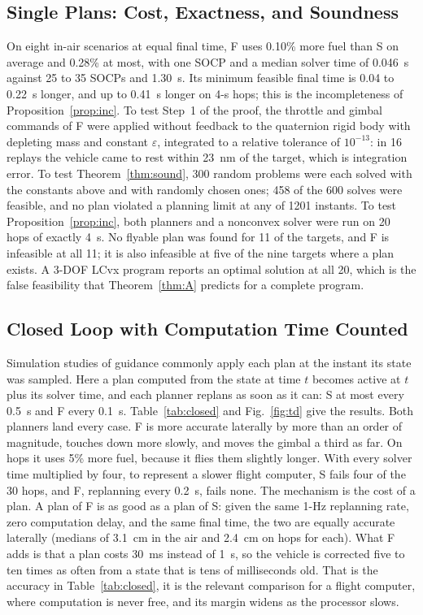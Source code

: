 \subsection{Single Plans: Cost, Exactness, and Soundness}
On eight in-air scenarios at equal final time, F uses 0.10\% more fuel than S on average and 0.28\% at most, with one SOCP
and a median solver time of 0.046~s against 25 to 35 SOCPs and 1.30~s. Its minimum feasible final time is 0.04 to 0.22~s
longer, and up to 0.41~s longer on 4-s hops; this is the incompleteness of Proposition~\ref{prop:inc}. To test Step~1 of the
proof, the throttle and gimbal commands of F were applied without feedback to the quaternion rigid body with depleting mass
and constant $\varepsilon$, integrated to a relative tolerance of $10^{-13}$: in 16 replays the vehicle came to rest within
23~nm of the target, which is integration error. To test Theorem~\ref{thm:sound}, 300 random problems were each solved with
the constants above and with randomly chosen ones; 458 of the 600 solves were feasible, and no plan violated a planning limit
at any of 1201 instants. To test Proposition~\ref{prop:inc}, both planners and a nonconvex solver were run on 20 hops of
exactly 4~s. No flyable plan was found for 11 of the targets, and F is infeasible at all 11; it is also infeasible at five of
the nine targets where a plan exists. A 3-DOF LCvx program reports an optimal solution at all 20, which is the false
feasibility that Theorem~\ref{thm:A} predicts for a complete program.

\subsection{Closed Loop with Computation Time Counted}
Simulation studies of guidance commonly apply each plan at the instant its state was sampled. Here a plan computed from the
state at time $t$ becomes active at $t$ plus its solver time, and each planner replans as soon as it can: S at most every
0.5~s and F every 0.1~s. Table~\ref{tab:closed} and Fig.~\ref{fig:td} give the results. Both planners land every case. F is more accurate
laterally by more than an order of magnitude, touches down more slowly, and moves the gimbal a third as far. On hops it uses
5\% more fuel, because it flies them slightly longer. With every solver time multiplied by four, to represent a slower flight
computer, S fails four of the 30 hops, and F, replanning every 0.2~s, fails none. The mechanism is
the cost of a plan. A plan of F is as good as a plan of S: given the same 1-Hz replanning rate, zero computation delay, and
the same final time, the two are equally accurate laterally (medians of 3.1~cm in the air and 2.4~cm on hops for each). What
F adds is that a plan costs 30~ms instead of 1~s, so the vehicle is corrected five to ten times as often from a state that
is tens of milliseconds old. That is the accuracy in Table~\ref{tab:closed}, it is the relevant comparison for a flight
computer, where computation is never free, and its margin widens as the processor slows.

